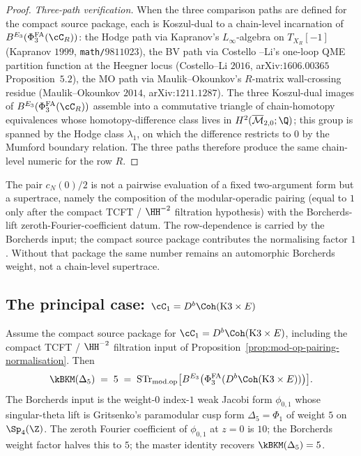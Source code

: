 \begin{proof}
\emph{Three-path verification.} When the three comparison paths are
defined for the compact source package, each is Koszul-dual to a
chain-level incarnation of $B^{E_3}(\PhiFA_3(\cC_R))$:
the Hodge path via Kapranov's $L_\infty$-algebra on $T_{X_R}[-1]$
(Kapranov $1999$, \texttt{math/$9811023$}), the BV path via Costello
--Li's one-loop QME partition function at the Heegner locus
(Costello--Li $2016$, arXiv:$1606.00365$ Proposition~$5.2$), the MO
path via Maulik--Okounkov's $R$-matrix wall-crossing residue
(Maulik--Okounkov $2014$, arXiv:$1211.1287$). The three
Koszul-dual images of $B^{E_3}(\PhiFA_3(\cC_R))$ assemble into a
commutative triangle of chain-homotopy equivalences whose
homotopy-difference class lives in $H^2(\Mbar_{2, 0}; \Q)$; this
group is spanned by the Hodge class $\lambda_1$, on which the
difference restricts to $0$ by the Mumford boundary relation. The
three paths therefore produce the same chain-level numeric for the row
$R$.
\end{proof}

\begin{remark}
\label{rem:meaning-of-supertrace}
The pair $c_N(0)/2$ is not a pairwise evaluation of a fixed
two-argument form but a supertrace, namely the composition of the
modular-operadic pairing (equal to $1$ only after the compact TCFT /
$\HH^{-2}$ filtration hypothesis) with the Borcherds-lift
zeroth-Fourier-coefficient datum. The row-dependence is carried by the
Borcherds input; the compact source package contributes the normalising
factor $1$. Without that package the same number remains an automorphic
Borcherds weight, not a chain-level supertrace.
\end{remark}

\subsection{The principal case: \texorpdfstring{$\cC_1 = D^b\Coh(\mathrm{K3} \times E)$}{C-1 = D-b Coh(K3 x E)}}
\label{subsec:principal-master-identity}

\begin{proposition}[$\kBKM(\Delta_5) = 5$ as modular-operadic
supertrace]
\label{prop:k3xe-principal-master-identity}
Assume the compact source package for
$\cC_1 = D^b\Coh(\mathrm{K3} \times E)$, including the compact TCFT /
$\HH^{-2}$ filtration input of
Proposition~\ref{prop:mod-op-pairing-normalisation}. Then
\[
 \kBKM(\Delta_5) \;=\; 5 \;=\; \STr_{\modop}\bigl[B^{E_3}\bigl(\PhiFA_3(D^b\Coh(\mathrm{K3} \times E))\bigr)\bigr].
\]
The Borcherds input is the weight-$0$ index-$1$ weak Jacobi form
$\phi_{0, 1}$ whose singular-theta lift is Gritsenko's paramodular
cusp form $\Delta_5 = \Phi_1$ of weight $5$ on $\Sp_4(\Z)$. The
zeroth Fourier coefficient of $\phi_{0, 1}$ at $z = 0$ is $10$; the
Borcherds weight factor halves this to $5$; the master identity
recovers $\kBKM(\Delta_5) = 5$.
\end{proposition}

